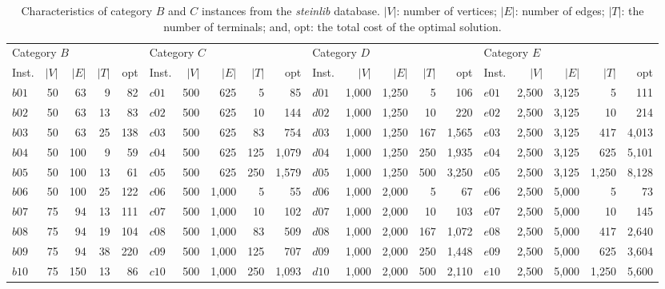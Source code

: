\documentclass[journal]{IEEEtran}
\begin{document}
\begin{table}[h]
\centering
\caption[Characteristics of category $B$, $C$, $D$ and $E$ instances from the \textit{steinlib} database]{Characteristics of category $B$ and $C$ instances from the \textit{steinlib} database. $|V|$: number of vertices; $|E|$: number of edges; $|T|$: the number of terminals; and,
         opt: the total cost of the optimal solution.}\label{tab:stpgprobs1}
\begin{adjustbox}{width=\textwidth}
\begin{tabular}{lrrrr|lrrrr|lrrrr|lrrrr} \toprule
\multicolumn{5}{l}{Category $B$} & \multicolumn{5}{l}{Category $C$}&\multicolumn{5}{l}{Category $D$} & \multicolumn{5}{l}{Category $E$}\\ 
\cmidrule(lr){1-5} \cmidrule(lr){6-10}\cmidrule(lr){11-15}\cmidrule(lr){16-20}
Inst.&$|V|$&$|E|$&$|T|$&opt& Inst.&$|V|$&$|E|$&$|T|$&opt&Inst.&$|V|$&$|E|$&$|T|$&opt& Inst.&$|V|$&$|E|$&$|T|$&opt\\ \hline
$b01$ & 50 & 63 & 9 & 82 & $c01$ & 500 & 625 & 5 & 85&  $d01$ & 1,000 & 1,250 & 5 & 106 & $e01$ & 2,500 & 3,125 & 5 & 111\\
$b02$ & 50 & 63 & 13 & 83& $c02$ & 500 & 625 & 10 & 144&  $d02$ & 1,000 & 1,250 & 10 & 220 & $e02$ & 2,500 & 3,125 & 10 & 214\\
$b03$ & 50 & 63 & 25 & 138& $c03$ & 500 & 625 & 83 & 754&  $d03$ & 1,000 & 1,250 & 167 & 1,565& $e03$ & 2,500 & 3,125 & 417 & 4,013\\
$b04$ & 50 & 100 & 9 & 59& $c04$ & 500 & 625 & 125 & 1,079&  $d04$ & 1,000 & 1,250 & 250 & 1,935& $e04$ & 2,500 & 3,125 & 625 & 5,101\\
$b05$ & 50 & 100 & 13 & 61& $c05$ & 500 & 625 & 250 & 1,579&  $d05$ & 1,000 & 1,250 & 500 & 3,250& $e05$ & 2,500 & 3,125 & 1,250 & 8,128\\
$b06$ & 50 & 100 & 25 & 122& $c06$ & 500 & 1,000 & 5 & 55&  $d06$ & 1,000 & 2,000 & 5 & 67& $e06$ & 2,500 & 5,000 & 5 & 73\\
$b07$ & 75 & 94 & 13 & 111& $c07$ & 500 & 1,000 & 10 & 102&  $d07$ & 1,000 & 2,000 & 10 & 103& $e07$ & 2,500 & 5,000 & 10 & 145\\
$b08$ & 75 & 94 & 19 & 104& $c08$ & 500 & 1,000 & 83 & 509&  $d08$ & 1,000 & 2,000 & 167 & 1,072& $e08$ & 2,500 & 5,000 & 417 & 2,640\\
$b09$ & 75 & 94 & 38 & 220& $c09$ & 500 & 1,000 & 125 & 707&  $d09$ & 1,000 & 2,000 & 250 & 1,448& $e09$ & 2,500 & 5,000 & 625 & 3,604\\
$b10$ & 75 & 150 & 13 & 86& $c10$ & 500 & 1,000 & 250 &1,093&  $d10$ & 1,000 & 2,000 & 500 & 2,110& $e10$ & 2,500 & 5,000 & 1,250 &5,600\\

\end{tabular}
\end{adjustbox}
\end{table}
\end{document}
